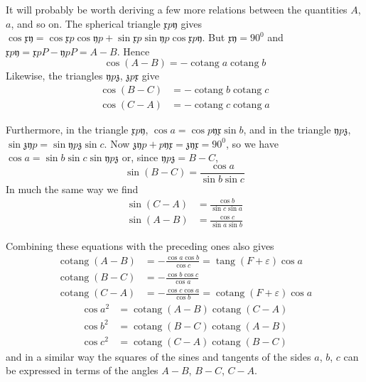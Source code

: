%
It will probably be worth deriving a few more relations between the quantities
$A$, $a$, and so on. The spherical triangle $\mathfrak{x}p\mathfrak{y}$ gives
$\cos\mathfrak{x}\mathfrak{y}=\cos\mathfrak{x}p\cos\mathfrak{y}p+\sin\mathfrak{x}p\sin\mathfrak{y}p\cos\mathfrak{x}p\mathfrak{y}$.
But $\mathfrak{x}\mathfrak{y}=90^0$ and
$\mathfrak{x}p\mathfrak{y}=\mathfrak{x}pP-\mathfrak{y}pP=A-B$. Hence
\[
\cos(A-B)=-\operatorname{cotang}a\operatorname{cotang}b
\]
Likewise, the triangles $\mathfrak{y}p\mathfrak{z}$, $\mathfrak{z}p\mathfrak{x}$ give
\[
\begin{aligned}
\cos(B-C)&=-\operatorname{cotang}b\operatorname{cotang}c\\
\cos(C-A)&=-\operatorname{cotang}c\operatorname{cotang}a
\end{aligned}
\]

Furthermore, in the triangle $\mathfrak{x}p\mathfrak{y}$,
$\cos a=\cos p\mathfrak{y}\mathfrak{x}\sin b$, and in the triangle
$\mathfrak{y}p\mathfrak{z}$, $\sin\mathfrak{z}\mathfrak{y}p=\sin\mathfrak{y}p\mathfrak{z}\sin c$.
Now $\mathfrak{z}\mathfrak{y}p+p\mathfrak{y}\mathfrak{x}=\mathfrak{z}\mathfrak{y}\mathfrak{x}=90^0$,
so we have $\cos a=\sin b\sin c\sin\mathfrak{y}p\mathfrak{z}$ or, since
$\mathfrak{y}p\mathfrak{z}=B-C$,
\[
\sin(B-C)=\frac{\cos a}{\sin b\sin c}
\]
In much the same way we find
\[
\begin{aligned}
\sin(C-A)&=\frac{\cos b}{\sin c\sin a}\\
\sin(A-B)&=\frac{\cos c}{\sin a\sin b}
\end{aligned}
\]

Combining these equations with the preceding ones also gives
\[
\begin{aligned}
\operatorname{cotang}(A-B)&=-\frac{\cos a\cos b}{\cos c}=\operatorname{tang}(F+\varepsilon)\cos a\\
\operatorname{cotang}(B-C)&=-\frac{\cos b\cos c}{\cos a}\\
\operatorname{cotang}(C-A)&=-\frac{\cos c\cos a}{\cos b}=\operatorname{cotang}(F+\varepsilon)\cos a
\end{aligned}
\]
\[
\begin{aligned}
\cos a^2&=\operatorname{cotang}(A-B)\operatorname{cotang}(C-A)\\
\cos b^2&=\operatorname{cotang}(B-C)\operatorname{cotang}(A-B)\\
\cos c^2&=\operatorname{cotang}(C-A)\operatorname{cotang}(B-C)
\end{aligned}
\]
and in a similar way the squares of the sines and tangents of the sides
$a$, $b$, $c$ can be expressed in terms of the angles $A-B$, $B-C$, $C-A$.

